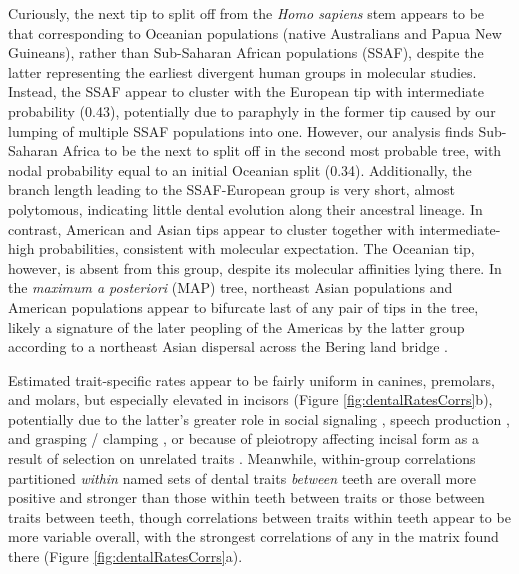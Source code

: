 Curiously, the next tip to split off from the \textit{Homo sapiens} stem appears to be that corresponding to Oceanian populations (native Australians and Papua New Guineans), rather than Sub-Saharan African populations (SSAF), despite the latter representing the earliest divergent human groups in molecular studies. Instead, the SSAF appear to cluster with the European tip with intermediate probability (0.43), potentially due to paraphyly in the former tip caused by our lumping of multiple SSAF populations into one. However, our analysis finds Sub-Saharan Africa to be the next to split off in the second most probable tree, with nodal probability equal to an initial Oceanian split (0.34). Additionally, the branch length leading to the SSAF-European group is very short, almost polytomous, indicating little dental evolution along their ancestral lineage. In contrast, American and Asian tips appear to cluster together with intermediate-high probabilities, consistent with molecular expectation. The Oceanian tip, however, is absent from this group, despite its molecular affinities lying there. In the \textit{maximum a posteriori} (MAP) tree, northeast Asian populations and American populations appear to bifurcate last of any pair of tips in the tree, likely a signature of the later peopling of the Americas by the latter group according to a northeast Asian dispersal across the Bering land bridge \citep{mulliganPeoplingAmericasOrigin2017}.

Estimated trait-specific rates appear to be fairly uniform in canines, premolars, and molars, but especially elevated in incisors (Figure \ref{fig:dentalRatesCorrs}b), potentially due to the latter's greater role in social signaling \citep{demirSmileDentalAesthetics2017}, speech production \citep{howellVariationSizeShape1987}, and grasping / clamping \citep{trinkausNeandertalFaceEvolutionary1987}, or because of pleiotropy affecting incisal form as a result of selection on unrelated traits \citep{hluskoEnvironmentalSelectionLast2018}. Meanwhile, within-group correlations partitioned \textit{within} named sets of dental traits \textit{between} teeth are overall more positive and stronger than those within teeth between traits or those between traits between teeth, though correlations between traits within teeth appear to be more variable overall, with the strongest correlations of any in the matrix found there (Figure \ref{fig:dentalRatesCorrs}a). 

